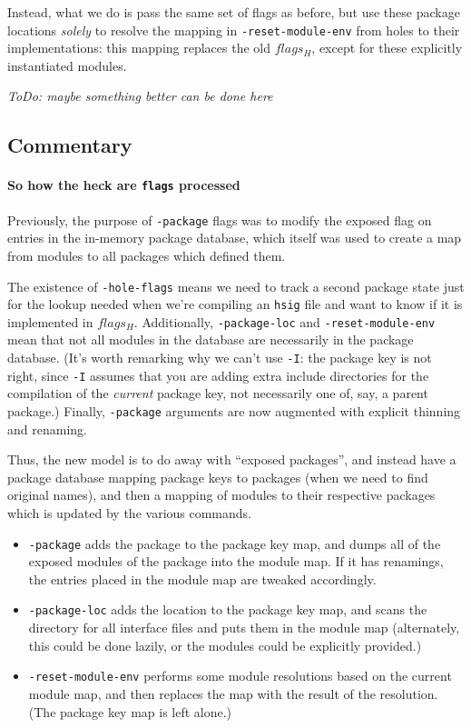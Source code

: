 \documentclass{article}
\begin{document}
Instead, what we do is pass the same set of flags as before, but use these package
locations \emph{solely} to resolve the mapping in \verb|-reset-module-env| from holes
to their implementations: this mapping replaces the old $flags_H$, except for these
explicitly instantiated modules.

\emph{ToDo: maybe something better can be done here}

\subsection{Commentary}

\paragraph{So how the heck are \texttt{flags} processed}  Previously, the purpose of
\verb|-package| flags was to modify the exposed flag on entries in the in-memory package
database, which itself was used to create a map from modules to all packages which
defined them.

The existence of \verb|-hole-flags| means we need to track a second package state just for
the lookup needed when we're compiling an \verb|hsig| file and want to know if it is
implemented in $flags_H$.  Additionally, \verb|-package-loc| and \verb|-reset-module-env|
mean that not all modules in the database are necessarily in the package database. (It's worth
remarking why we can't use \verb|-I|: the package key is not right, since \verb|-I| assumes
that you are adding extra include directories for the compilation of the \emph{current} package
key, not necessarily one of, say, a parent package.)  Finally, \verb|-package| arguments
are now augmented with explicit thinning and renaming.

Thus, the new model is to do away with ``exposed packages'', and instead have a package
database mapping package keys to packages (when we need to find original names), and then
a mapping of modules to their respective packages which is updated by the various commands.

\begin{itemize}
    \item \verb|-package| adds the package to the package key map, and
        dumps all of the exposed modules of the package into the module
        map.  If it has renamings, the entries placed in the module map
        are tweaked accordingly.
    \item \verb|-package-loc| adds the location to the package key map,
        and scans the directory for all interface files and puts them in
        the module map (alternately, this could be done lazily, or the
        modules could be explicitly provided.)
    \item \verb|-reset-module-env| performs some module resolutions based
        on the current module map, and then replaces the map with the result
        of the resolution. (The package key map is left alone.)
\end{itemize}
\end{document}
